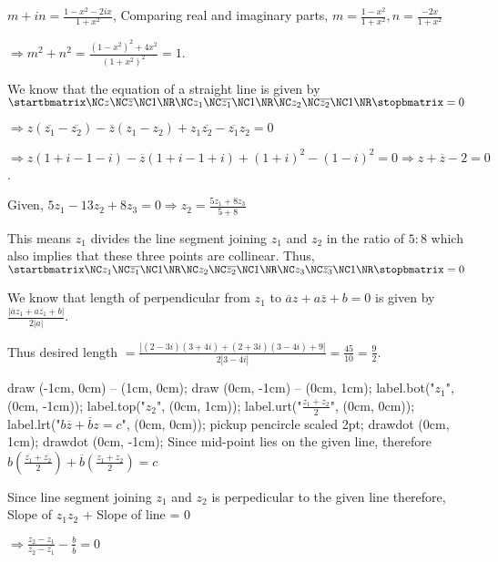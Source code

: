   $m + in = \frac{1 - x^2 - 2ix}{1 + x^2}$, Comparing real and imaginary parts, $m = \frac{1 - x^2}{1 +
  x^2}, n = \frac{-2x}{1 + x^2}$

  $\Rightarrow m^2 + n^2 = \frac{(1 - x^2)^2 + 4x^2}{(1 + x^2)^2} = 1$.
\item We know that the equation of a straight line is given by $\startbmatrix\NC z \NC \overline{z} \NC
  1\NR\NC z_1 \NC \overline{z_1} \NC 1 \NR\NC z_2 \NC \overline{z_2} \NC 1\NR\stopbmatrix = 0$

  $\Rightarrow z(\overline{z_1} - \overline{z_2}) - \overline{z}(z_1 - z_2) + z_1\overline{z_2} -
  \overline{z_1}z_2 = 0$

  $\Rightarrow z(1 + i - 1 - i) - \overline{z}(1 + i -1 + i) + (1 + i)^2 - (1 - i)^2 = 0\Rightarrow z +
  \overline{z} - 2 = 0$.
\item Given, $5z_1 - 13z_2 + 8z_3 = 0 \Rightarrow z_2 = \frac{5z_1 + 8z_3}{5 + 8}$

  This means $z_1$ divides the line segment joining $z_1$ and $z_2$ in the ratio of $5:8$ which also implies
  that these three points are collinear. Thus, $\startbmatrix\NC z_1 \NC \overline{z_1} \NC 1\NR\NC z_2 \NC
  \overline{z_2} \NC 1\NR\NC z_3 \NC \overline{z_3} \NC 1\NR\stopbmatrix = 0$
\item We know that length of perpendicular from $z_1$ to $\overline{a}z + a\overline{z} + b = 0$ is given by
  $\frac{|\overline{a}z_1 + a\overline{z_1} + b|}{2|a|}.$

  Thus desired length $= \frac{|(2 - 3i)(3 + 4i) + (2 + 3i)(3 - 4i) + 9|}{2|3 - 4i|} = \frac{45}{10} =
  \frac{9}{2}$.
\item
  \startplacefigure[location={left, none}]
    \startMPcode
      draw (-1cm, 0cm) -- (1cm, 0cm);
      draw (0cm, -1cm) -- (0cm, 1cm);
      label.bot("$z_1$", (0cm, -1cm));
      label.top("$z_2$", (0cm, 1cm));
      label.urt("$\frac{z_1 + z_2}{2}$", (0cm, 0cm));
      label.lrt("$b\overline{z} + \overline{b}z = c$", (0cm, 0cm));
      pickup pencircle scaled 2pt;
      drawdot (0cm, 1cm);
      drawdot (0cm, -1cm);
    \stopMPcode
  \stopplacefigure
  Since mid-point lies on the given line, therefore $b\left(\frac{\overline{z_1} + \overline{z_2}}{2}\right) +
  \overline{b}\left(\frac{z_1 + z_2}{2}\right) = c$

  Since line segment joining $z_1$ and $z_2$ is perpedicular to the given line therefore, Slope of $z_1z_2$ + Slope of line = 0

  $\Rightarrow \frac{z_2 - z_1}{\overline{z_2} - \overline{z_1}} - \frac{b}{\overline{b}} = 0$

